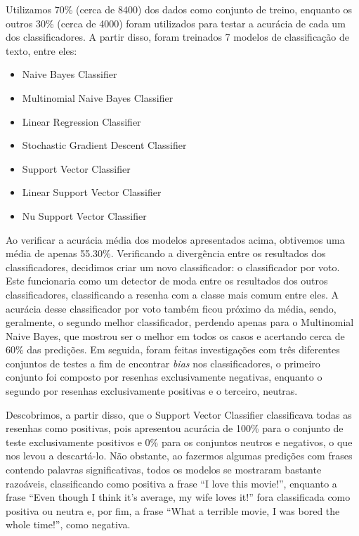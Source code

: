 \documentclass[review]{elsarticle}
\begin{document}
Utilizamos 70\% (cerca de 8400) dos dados como conjunto de treino, enquanto os outros 30\% (cerca de 4000) foram utilizados para testar a acurácia de cada um dos classificadores. A partir disso, foram treinados 7 modelos de classificação de texto, entre eles:

\begin{itemize}
	\item{Naive Bayes Classifier}
	\item{Multinomial Naive Bayes Classifier}
	\item{Linear Regression Classifier}
	\item{Stochastic Gradient Descent Classifier}
	\item{Support Vector Classifier}
	\item{Linear Support Vector Classifier}
	\item{Nu Support Vector Classifier}
\end{itemize}

Ao verificar a acurácia média dos modelos apresentados acima, obtivemos uma média de apenas 55.30\%. Verificando a divergência entre os resultados dos classificadores, decidimos criar um novo classificador: o classificador por voto. Este funcionaria como um detector de moda entre os resultados dos outros classificadores, classificando a resenha com a classe mais comum entre eles. A acurácia desse classificador por voto também ficou próximo da média, sendo, geralmente, o segundo melhor classificador, perdendo apenas para o Multinomial Naive Bayes, que mostrou ser o melhor em todos os casos e acertando cerca de 60\% das predições. Em seguida, foram feitas investigações com três diferentes conjuntos de testes a fim de encontrar \textit{bias} nos classificadores, o primeiro conjunto foi composto por resenhas exclusivamente negativas, enquanto o segundo por resenhas exclusivamente positivas e o terceiro, neutras. 

Descobrimos, a partir disso, que o Support Vector Classifier classificava todas as resenhas como positivas, pois apresentou acurácia de 100\% para o conjunto de teste exclusivamente positivos e 0\% para os conjuntos neutros e negativos, o que nos levou a descartá-lo. Não obstante, ao fazermos algumas predições com frases contendo palavras significativas, todos os modelos se mostraram bastante razoáveis, classificando como positiva a frase “I love this movie!”, enquanto a frase “Even though I think it's average, my wife loves it!” fora classificada como positiva ou neutra e, por fim, a frase “What a terrible movie, I was bored the whole time!”, como negativa.  
\end{document}
